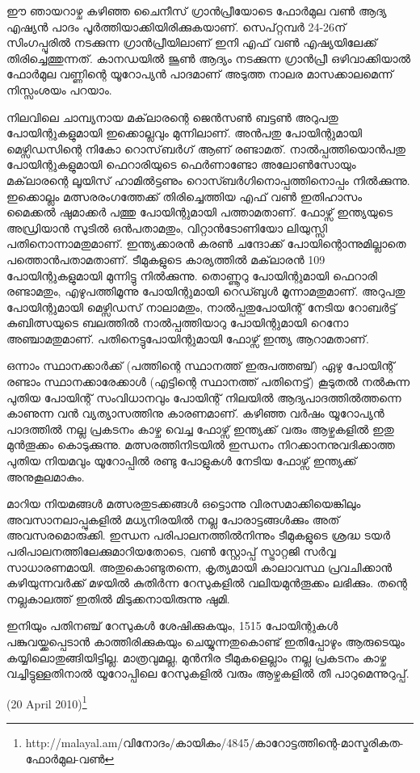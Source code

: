 \vskip 2pt

ഈ ഞായറാഴ്ച കഴിഞ്ഞ ചൈനീസ് ഗ്രാന്‍പ്രീയോടെ ഫോര്‍മുല വണ്‍ ആദ്യ എഷ്യന്‍ പാദം പൂര്‍ത്തിയാക്കിയിരിക്കുകയാണ്. 
സെപ്റ്റമ്പര്‍ 24-26ന് സിംഗപ്പൂരില്‍ നടക്കുന്ന ഗ്രാന്‍പ്രീയിലാണ് ഇനി എഫ് വണ്‍ എഷ്യയിലേക്ക് തിരിച്ചെത്തുന്നത്. 
കാനഡയില്‍ ജൂണ്‍ ആദ്യം നടക്കുന്ന ഗ്രാന്‍പ്രീ ഒഴിവാക്കിയാല്‍ ഫോര്‍മുല വണ്ണിന്റെ യൂറോപ്യന്‍ പാദമാണ് അടുത്ത 
നാലര മാസക്കാലമെന്ന് നിസ്സംശയം പറയാം.

നിലവിലെ ചാമ്പ്യനായ മക്‌ലാരന്റെ ജെന്‍സണ്‍ ബട്ടണ്‍ അറുപതു പോയിന്റുകളുമായി ഇക്കൊല്ലവും മുന്നിലാണ്. 
അന്‍പതു പോയിന്റുമായി മെഴ്സിഡസിന്റെ നികോ റൊസ്‌ബര്‍ഗ് ആണ് രണ്ടാമത്. നാല്‍പ്പത്തിയൊന്‍പതു പോയിന്റുകളുമായി 
ഫെറാരിയുടെ ഫെര്‍ണാണ്ടോ അലോണ്‍സോയും മക്‌ലാരന്റെ ലൂയിസ് ഹാമില്‍ട്ടണും റൊസ്ബര്‍ഗിനൊപ്പത്തിനൊപ്പം 
നില്‍ക്കുന്നു. ഇക്കൊല്ലം മത്സരരംഗത്തേക്ക് തിരിച്ചെത്തിയ എഫ് വണ്‍ ഇതിഹാസം മൈക്കല്‍ ഷുമാക്കര്‍ പത്തു 
പോയിന്റുമായി പത്താമതാണ്. ഫോഴ്സ് ഇന്ത്യയുടെ അഡ്രിയാന്‍ സുടില്‍ ഒന്‍പതാമതും, വിറ്റാന്‍ടോണിയോ ലിയുസ്സി 
പതിനൊന്നാമതുമാണ്. ഇന്ത്യക്കാരന്‍ കരണ്‍ ചന്ദോക്ക് പോയിന്റൊന്നുമില്ലാതെ പത്തൊന്‍പതാമതാണ്. ടീമുകളുടെ 
കാര്യത്തില്‍ മക്‌ലാരന്‍ 109 പോയിന്റുകളുമായി മുന്നിട്ടു നില്‍ക്കുന്നു. തൊണ്ണൂറു പോയിന്റുമായി ഫെറാരി രണ്ടാമതും, 
എഴുപത്തിമൂന്നു പോയിന്റുമായി റെഡ്ബുള്‍ മൂന്നാമതുമാണ്. അറുപതു പോയിന്റുമായി മെഴ്സിഡസ് നാലാമതും, 
നാല്‍പ്പതുപോയിന്റ് നേടിയ റോബര്‍ട്ട് കുബിത്സയുടെ ബലത്തില്‍ നാല്‍പ്പത്തിയാറു പോയിന്റുമായി റെനോ 
അഞ്ചാമതുമാണ്. പതിനെട്ടുപോയിന്റുമായി ഫോഴ്സ് ഇന്ത്യ ആറാമതാണ്.

ഒന്നാം സ്ഥാനക്കാര്‍ക്ക് (പത്തിന്റെ സ്ഥാനത്ത് ഇരുപത്തഞ്ച്) ഏഴു പോയിന്റ് രണ്ടാം സ്ഥാനക്കാരേക്കാള്‍ (എട്ടിന്റെ 
സ്ഥാനത്ത് പതിനെട്ട്) കൂടുതല്‍ നല്‍കുന്ന പുതിയ പോയിന്റ് സംവിധാനവും പോയിന്റ് നിലയില്‍ ആദ്യപാദത്തില്‍ത്തന്നെ 
കാണുന്ന വന്‍ വ്യത്യാസത്തിനു കാരണമാണ്. കഴിഞ്ഞ വര്‍ഷം യൂറോപ്യന്‍ പാദത്തില്‍ നല്ല പ്രകടനം കാഴ്ച വെച്ച 
ഫോഴ്സ് ഇന്ത്യക്ക് വരും ആഴ്ചകളില്‍ ഇതു മുന്‍തൂക്കം കൊടുക്കുന്നു. മത്സരത്തിനിടയില്‍ ഇന്ധനം നിറക്കാനനുവദിക്കാത്ത 
പുതിയ നിയമവും യൂറോപ്പില്‍ രണ്ടു പോളുകള്‍ നേടിയ ഫോഴ്സ് ഇന്ത്യക്ക് അനുകൂലമാകും.

മാറിയ നിയമങ്ങള്‍ മത്സരതുടക്കങ്ങള്‍ ഒട്ടൊന്നു വിരസമാക്കിയെങ്കിലും അവസാനലാപ്പുകളില്‍ മധ്യനിരയില്‍ നല്ല 
പോരാട്ടങ്ങള്‍ക്കും അത് അവസരമൊരുക്കി. ഇന്ധന പരിപാലനത്തില്‍നിന്നും ടീമുകളുടെ ശ്രദ്ധ ടയര്‍ 
പരിപാലനത്തിലേക്കുമാറിയതോടെ, വണ്‍ സ്റ്റോപ്പ് സ്ട്രാറ്റജി സര്‍‌വ്വ സാധാരണമായി. അതുകൊണ്ടുതന്നെ, കൃത്യമായി 
കാലാവസ്ഥ പ്രവചിക്കാന്‍ കഴിയുന്നവര്‍ക്ക് മഴയില്‍ കുതിര്‍ന്ന റേസുകളില്‍ വലിയമുന്‍തൂക്കം ലഭിക്കും. തന്റെ നല്ലകാലത്ത് 
ഇതില്‍ മിടുക്കനായിരുന്നു ഷുമി.

ഇനിയും പതിനഞ്ച് റേസുകള്‍ ശേഷിക്കുകയും, 1515 പോയിന്റുകള്‍ പങ്കുവയ്ക്കപ്പെടാന്‍ കാത്തിരിക്കുകയും ചെയ്യുന്നതുകൊണ്ട് 
ഇതിപ്പോഴും ആരുടെയും കയ്യിലൊതുങ്ങിയിട്ടില്ല. മാത്രവുമല്ല, മുന്‍നിര ടീമുകളെല്ലാം നല്ല പ്രകടനം കാഴ്ച വച്ചിട്ടുള്ളതിനാല്‍ 
യൂറോപ്പിലെ റേസുകളില്‍ വരും ആഴ്ചകളില്‍ തീ പാറുമെന്നുറുപ്പ്. 

(20 April 2010)\footnote{http://malayal.am/വിനോദം/കായികം/4845/കാറോട്ടത്തിന്റെ-മാസ്മരികത-ഫോര്‍മുല-വണ്‍}

\newpage
